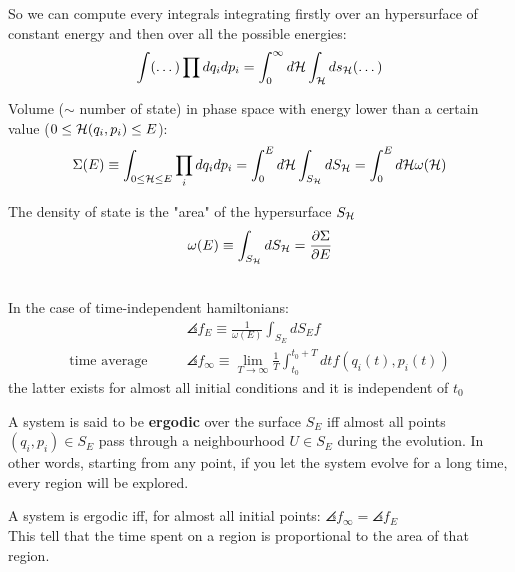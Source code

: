 So we can compute every integrals integrating firstly over an hypersurface of constant energy and then over all the possible energies:
$$ \int (\dots) \prod dq_i dp_i = \int_0^\infty d\mathcal{H} \int_{\mathcal{H}} ds_{\mathcal{H}} (\dots)$$


\Def Volume ($\sim$ number of state) in phase space with energy lower than a certain value ($0\le\mathcal{H}(q_i,p_i)\le E$):
$$ \Sigma (E) \equiv \int_{0\le \mathcal{H} \le E} \prod _i dq_i dp_i = \int_0^E d\mathcal{H} \int_{S_{\mathcal{H}}}dS_{\mathcal{H}} = \int_0^E d\mathcal{H} \omega(\mathcal{H})$$

\Def The density of state is the "area" of the hypersurface $S_{\mathcal{H}}$
$$ \omega(E) \equiv \int_{S_{\mathcal{H}}} dS_{\mathcal{H}}= \frac{\partial\Sigma}{\partial E}$$

\\

In the case of time-independent hamiltonians:
\begin{align*}    
&\angles f _E \equiv \frac1{\omega(E)} \int_{S_E} dS_E f\\
\text{time average}\qquad &\angles f_\infty \equiv \lim_{T\to \infty} \frac 1T \int_{t_0}^{t_0+T} dt f(q_i(t), p_i(t))
\end{align*} 
the latter exists for almost all initial conditions and it is independent of $t_0$

\Def A system is said to be \textbf{ergodic} over the surface $S_E$ iff almost all points $(q_i,p_i) \in S_E$ pass through a neighbourhood $U \in S_E$ during the evolution. In other words, starting from any point, if you let the system evolve for a long time, every region will be explored.

\Th A system is ergodic iff, for almost all initial points: $\angles f_\infty = \angles f_E$\\
This tell that the time spent on a region is proportional to the area of that region. 


